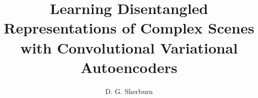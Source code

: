 \documentclass[a4paper,12pt,twoside]{report}
\begin{document}
\title{\LARGE {\bf Learning Disentangled Representations of Complex Scenes with Convolutional Variational Autoencoders}\\
 \vspace*{6mm}
}

\author{D. G. Sherburn}

\normallinespacing
\maketitle

\preface




\body






\appendix




\end{document}
